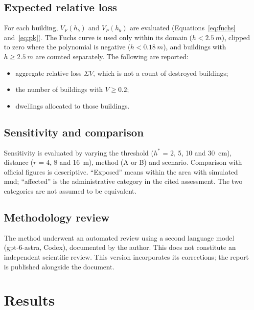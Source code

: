 \documentclass[10pt,a4paper]{article}
\begin{document}
\subsection{Expected relative loss}
For each building, $V_F(h_b)$ and $V_P(h_b)$ are evaluated (Equations~\ref{eq:fuchs} and~\ref{eq:pk}). The Fuchs curve is used only within its domain ($h<\SI{2.5}{m}$), clipped to zero where the polynomial is negative ($h<\SI{0.18}{m}$), and buildings with $h\geq\SI{2.5}{m}$ are counted separately. The following are reported:
\begin{itemize}
\item aggregate relative loss $\Sigma V$, which is not a count of destroyed buildings;
\item the number of buildings with $V\geq0.2$;
\item dwellings allocated to those buildings.
\end{itemize}

\subsection{Sensitivity and comparison}
Sensitivity is evaluated by varying the threshold ($h^*$ = 2, 5, 10 and \SI{30}{cm}), distance ($r$ = 4, 8 and \SI{16}{m}), method (A or B) and scenario. Comparison with official figures is descriptive. ``Exposed'' means within the area with simulated mud; ``affected'' is the administrative category in the cited assessment. The two categories are not assumed to be equivalent.

\subsection{Methodology review}
The method underwent an automated review using a second language model (gpt-6-astra, Codex), documented by the author. This does not constitute an independent scientific review. This version incorporates its corrections; the report is published alongside the document.

\section{Results}

\end{document}
